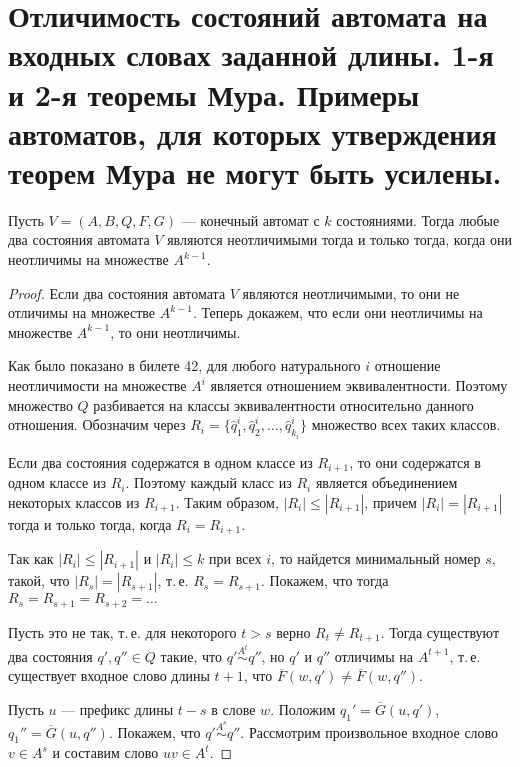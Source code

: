\section{Отличимость состояний автомата на входных словах заданной длины. 1-я и 2-я теоремы Мура. Примеры автоматов, для которых утверждения теорем Мура не могут быть усилены.}

\begin{theorem}
    Пусть $V=(A, B, Q, F, G)$ --- конечный автомат с $k$ состояниями. Тогда любые два состояния автомата $V$ являются неотличимыми тогда и только тогда, когда они неотличимы на множестве $A^{k−1}$.
\end{theorem}

\begin{proof}
    Если два состояния автомата $V$ являются неотличимыми, то они не отличимы на множестве $A^{k-1}$. Теперь докажем, что если они неотличимы на множестве $A^{k-1}$, то они неотличимы.

    Как было показано в билете 42, для любого натурального $i$ отношение неотличимости на множестве $A^i$ является отношением эквивалентности. Поэтому множество $Q$ разбивается на классы эквивалентности относительно данного отношения. Обозначим через $R_i = \{\hat{q}^i_1, \hat{q}^i_2, \ldots, \hat{q}^i_{k_i}\}$ множество всех таких классов.

    Если два состояния содержатся в одном классе из $R_{i+1}$, то они содержатся в одном классе из $R_i$. Поэтому каждый класс из $R_i$ является объединением некоторых классов из $R_{i+1}$. Таким образом, $|R_i| \leqslant |R_{i+1}|$, причем $|R_i| = |R_{i+1}|$ тогда и только тогда, когда $R_i = R_{i+1}$.

    Так как $|R_i| \leqslant |R_{i+1}|$ и $|R_i| \leqslant k$ при всех $i$, то найдется минимальный номер $s$, такой, что $|R_s| = |R_{s+1}|$, т.\,е. $R_s = R_{s+1}$. Покажем, что тогда $R_s = R_{s+1} = R_{s+2} = \ldots$

    Пусть это не так, т.\,е. для некоторого $t > s$ верно $R_t \neq R_{t+1}$.
    Тогда существуют два состояния $q',q'' \in Q$ такие, что $q'\stackrel{A^t}{\sim} q''$, но $q'$ и $q''$ отличимы на $A^{t+1}$, т.\,е. существует входное слово длины $t+1$, что $\overline{F}(w, q') \neq \overline{F}(w, q'')$.
    
    Пусть $u$ --- префикс длины $t-s$ в слове $w$. Положим $q_1'= \overline{G}(u, q')$, $q_1''=\overline{G}(u, q'')$. Покажем, что $q'\stackrel{A^s}{\sim} q''$. Рассмотрим произвольное входное слово $v \in A^s$ и составим слово $uv \in A^t$.


\end{proof}
